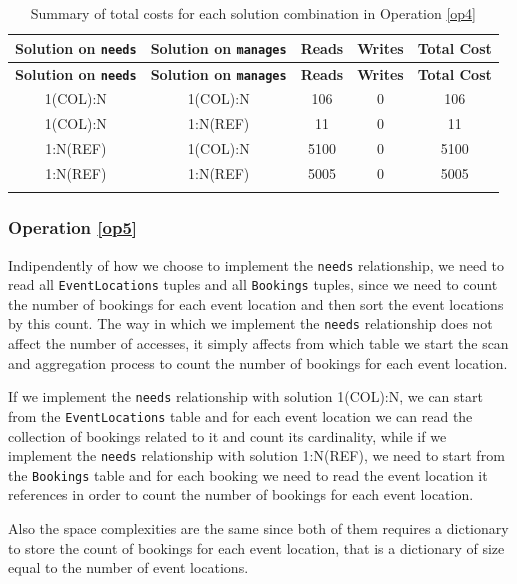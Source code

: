 \begin{longtable}[H]{|c|c|c|c|c|}
    \hline
    \textbf{Solution on \texttt{needs}} & \textbf{Solution on \texttt{manages}} & \textbf{Reads} & \textbf{Writes} & \textbf{Total Cost} \\
    \hline
    \endfirsthead
    \hline
    \textbf{Solution on \texttt{needs}} & \textbf{Solution on \texttt{manages}} & \textbf{Reads} & \textbf{Writes} & \textbf{Total Cost} \\
    \hline
    \endhead
    1(COL):N & 1(COL):N & 106 & 0 & 106 \\
    \hline
    1(COL):N & 1:N(REF) & 11 & 0 & 11 \\
    \hline
    1:N(REF) & 1(COL):N & 5100 & 0 & 5100 \\
    \hline
    1:N(REF) & 1:N(REF) & 5005 & 0 & 5005 \\
    \hline
    \caption{Summary of total costs for each solution combination in Operation \ref{op4}}
    \label{tab:op4-summary}
\end{longtable}

\subsubsection{Operation \ref{op5}}

Indipendently of how we choose to implement the \texttt{needs} relationship, we need to read all \texttt{EventLocations} tuples and all \texttt{Bookings} tuples, since we need to count the number of bookings for each event location and then sort the event locations by this count. The way in which we implement the \texttt{needs} relationship does not affect the number of accesses, it simply affects from which table we start the scan and aggregation process to count the number of bookings for each event location. 

If we implement the \texttt{needs} relationship with solution 1(COL):N, we can start from the \texttt{EventLocations} table and for each event location we can read the collection of bookings related to it and count its cardinality, while if we implement the \texttt{needs} relationship with solution 1:N(REF), we need to start from the \texttt{Bookings} table and for each booking we need to read the event location it references in order to count the number of bookings for each event location.

Also the space complexities are the same since both of them requires a dictionary to store the count of bookings for each event location, that is a dictionary of size equal to the number of event locations.

